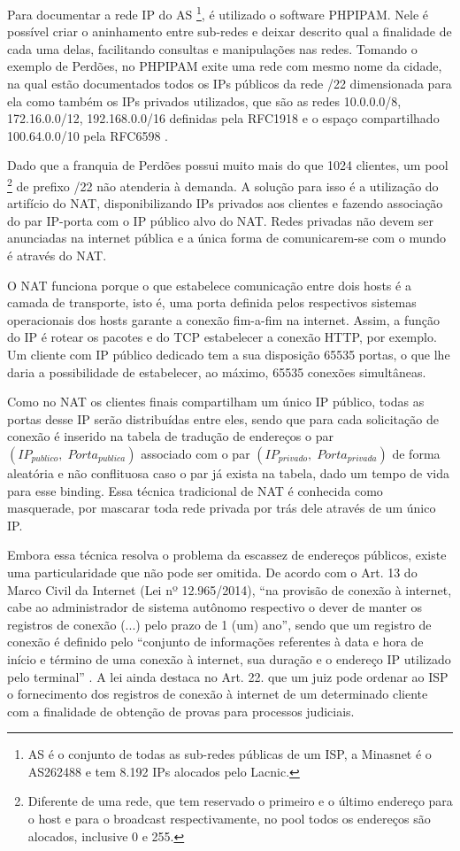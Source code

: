    Para documentar a rede IP do AS \footnote{AS é o conjunto de todas as sub-redes públicas de um ISP, a Minasnet é o AS262488 e tem 8.192 IPs alocados pelo Lacnic.}, é utilizado o software PHPIPAM. Nele é possível criar o aninhamento entre sub-redes e deixar descrito qual a finalidade de cada uma delas, facilitando consultas e manipulações nas redes. Tomando o exemplo de Perdões, no PHPIPAM exite uma rede com mesmo nome da cidade, na qual estão documentados todos os IPs públicos da rede /22 dimensionada para ela como também os IPs privados utilizados, que são as redes 10.0.0.0/8, 172.16.0.0/12, 192.168.0.0/16 definidas pela RFC1918 \cite{rfc1918} e o espaço compartilhado 100.64.0.0/10 pela RFC6598 \cite{rfc6598}.
   
   Dado que a franquia de Perdões possui muito mais do que 1024 clientes, um pool \footnote{Diferente de uma rede, que tem reservado o primeiro e o último endereço para o host e para o broadcast respectivamente, no pool todos os endereços são alocados, inclusive 0 e 255.} de prefixo /22 não atenderia à demanda. A solução para isso é a utilização do artifício do NAT, disponibilizando IPs privados aos clientes e fazendo associação do par IP-porta com o IP público alvo do NAT. Redes privadas não devem ser anunciadas na internet pública e a única forma de comunicarem-se com o mundo é através do NAT. 
   
   O NAT funciona porque o que estabelece comunicação entre dois hosts é a camada de transporte, isto é, uma porta definida pelos respectivos sistemas operacionais dos hosts garante a conexão fim-a-fim na internet. Assim, a função do IP é rotear os pacotes e do TCP estabelecer a conexão HTTP, por exemplo. Um cliente com IP público dedicado tem a sua disposição 65535 portas, o que lhe daria a possibilidade de estabelecer, ao máximo, 65535 conexões simultâneas.
   
   Como no NAT os clientes finais compartilham um único IP público, todas as portas desse IP serão distribuídas entre eles, sendo que para cada solicitação de conexão é inserido na tabela de tradução de endereços o par $ ( IP_{publico}, \; Porta_{publica} ) $ associado com o par $ ( IP_{privado}, \; Porta_{privada} ) $ de forma aleatória e não conflituosa caso o par já exista na tabela, dado um tempo de vida para esse binding. Essa técnica tradicional de NAT é conhecida como masquerade, por mascarar toda rede privada por trás dele através de um único IP.
   
   Embora essa técnica resolva o problema da escassez de endereços públicos, existe uma particularidade que não pode ser omitida. De acordo com o Art. 13 do Marco Civil da Internet (Lei nº 12.965/2014), ``na provisão de conexão à internet, cabe ao administrador de sistema autônomo respectivo o dever de manter os registros de conexão (...) pelo prazo de 1 (um) ano'', sendo que um registro de conexão é definido pelo ``conjunto de informações referentes à data e hora de início e término de uma conexão à internet, sua duração e o endereço IP utilizado pelo terminal'' \cite{lei12965}. A lei ainda destaca no Art. 22. que um juiz pode ordenar ao ISP o fornecimento dos registros de conexão à internet de um determinado cliente com a finalidade de obtenção de provas para processos judiciais.
   
